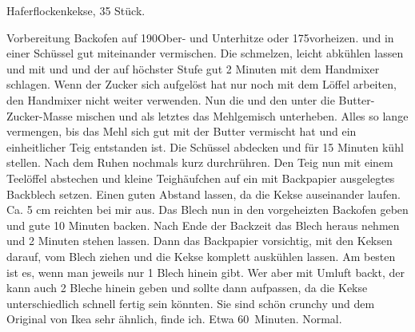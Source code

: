\begin{recipe}{Haferflockenkekse, 35 Stück.}
	\item[Vorbereitung] Backofen auf 190\textcelsius Ober- und Unterhitze oder 175\textcelsius vorheizen.
	 und 
	 in einer Schüssel gut miteinander vermischen. Die 
	 schmelzen, leicht abkühlen lassen und mit 
	 und
	 und der
	 auf höchster Stufe gut 2 Minuten mit dem Handmixer schlagen. Wenn der Zucker sich aufgelöst hat nur noch mit dem Löffel arbeiten, den Handmixer nicht weiter verwenden. Nun die 
	 und den 
	 unter die Butter-Zucker-Masse mischen und als letztes das Mehlgemisch unterheben. Alles so lange vermengen, bis das Mehl sich gut mit der Butter vermischt hat und ein einheitlicher Teig entstanden ist. Die Schüssel abdecken und für 15 Minuten kühl stellen. Nach dem Ruhen nochmals kurz durchrühren. Den Teig nun mit einem Teelöffel abstechen und kleine Teighäufchen auf ein mit Backpapier ausgelegtes Backblech setzen. 
	\hint Einen guten Abstand lassen, da die Kekse auseinander laufen. Ca. 5 cm reichten bei mir aus.
	Das Blech nun in den vorgeheizten Backofen geben und gute 10 Minuten backen. Nach Ende der Backzeit das Blech heraus nehmen und 2 Minuten stehen lassen. Dann das Backpapier vorsichtig, mit den Keksen darauf, vom Blech ziehen und die Kekse komplett auskühlen lassen. Am besten ist es, wenn man jeweils nur 1 Blech hinein gibt. Wer aber mit Umluft backt, der kann auch 2 Bleche hinein geben und sollte dann aufpassen, da die Kekse unterschiedlich schnell fertig sein könnten.
	\hint Sie sind schön crunchy und dem Original von Ikea sehr ähnlich, finde ich. 
	\preparationtime Etwa 60~Minuten.
	\washingup Normal.
\end{recipe}